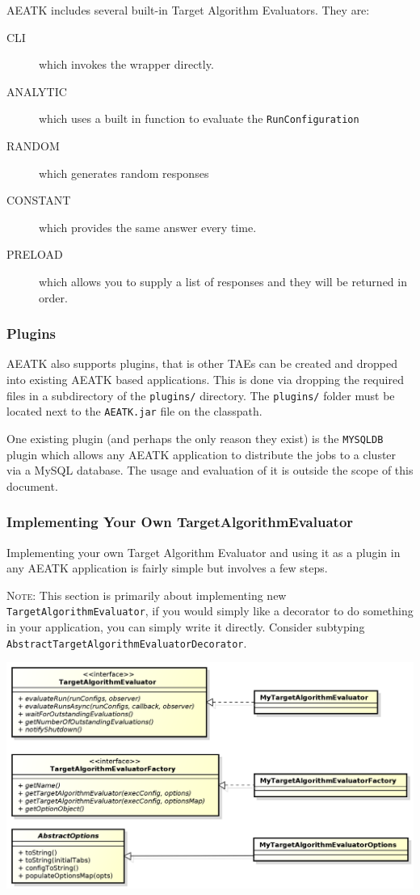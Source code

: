 \documentclass[11pt,letterpaper,oneside]{article}
\begin{document}
AEATK includes several built-in Target Algorithm Evaluators. They are:

\begin{description}
\item[CLI] which invokes the wrapper directly.
\item[ANALYTIC] which uses a built in function to evaluate the \texttt{RunConfiguration}
\item[RANDOM] which generates random responses
\item[CONSTANT] which provides the same answer every time.
\item[PRELOAD] which allows you to supply a list of responses and they will be returned in order.
\end{description}

\subsubsection{Plugins}

AEATK also supports plugins, that is other TAEs can be created and dropped into existing AEATK based applications. This is done via dropping the required files in a subdirectory of the \texttt{plugins/} directory. The \texttt{plugins/} folder must be located next to the \texttt{AEATK.jar} file on the classpath.

One existing plugin (and perhaps the only reason they exist) is the \texttt{MYSQLDB} plugin which allows any AEATK application to distribute the jobs to a cluster via a MySQL database. The usage and evaluation of it is outside the scope of this document.

\subsubsection{Implementing Your Own TargetAlgorithmEvaluator}

Implementing your own Target Algorithm Evaluator and using it as a plugin in any AEATK application is fairly simple but involves a few steps.

\textsc{Note}: This section is primarily about implementing new \texttt{TargetAlgorithmEvaluator}, if you would simply like a decorator to do something in your application, you can simply write it directly. Consider subtyping \texttt{AbstractTargetAlgorithmEvaluatorDecorator}.


\begin{center}
\includegraphics[scale=0.50]{img/UML/TAEFactory.png}
\end{center}
\end{document}
